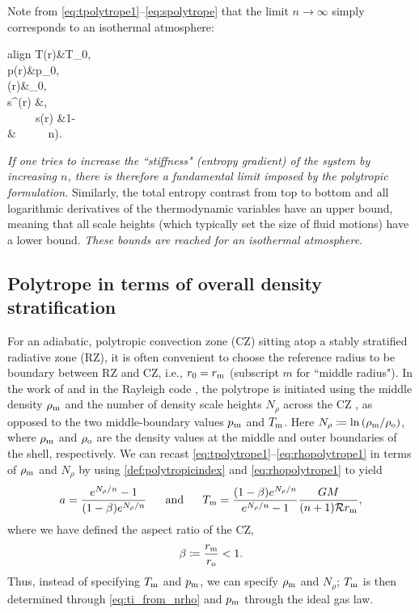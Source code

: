 \documentclass[12pt]{article} %
\newcommand{\rrm}{r_{\rm{m}}}
\newcommand{\andd}{\text{and}\ \ \ \ \ }
\newcommand{\five}{\ \ \ \ \ }
\begin{document}
Note from \eqref{eq:tpolytrope1}--\eqref{eq:spolytrope} that the limit $n\rightarrow\infty$ simply corresponds to an isothermal atmosphere:
	\begin{empheq}[box=\fbox]{align}\label{eq:limitninfty}
T(r)&\rightarrow T_0, \\
p(r)&\rightarrow p_0,\\
\rho(r)&\rightarrow \rho_0,\\
s^\prime(r) &\rightarrow {},\\
 \andd s(r) &\rightarrow {}\bigg{(}1-\bigg{)}\\ 
 &\ \ \ \ \  n\rightarrow\infty). \nonumber
\end{empheq}
\textit{If one tries to increase the ``stiffness" (entropy gradient) of the system by increasing $n$, there is therefore a fundamental limit imposed by the polytropic formulation.}
Similarly, the total entropy contrast from top to bottom and all logarithmic derivatives of the thermodynamic variables have an upper bound, meaning that all scale heights (which typically set the size of fluid motions) have a lower bound. \textit{These bounds are reached for an isothermal atmosphere.}

\subsection{Polytrope in terms of overall density stratification}
For an adiabatic, polytropic convection zone (CZ) sitting atop a stably stratified radiative zone (RZ), it is often convenient to choose the reference radius to be boundary between RZ and CZ, i.e., $r_0=\rrm$ (subscript $m$ for ``middle radius"). In the work of \citet{Jones11} and in the Rayleigh code \citep{Featherstone18}, the polytrope is initiated using the middle density $\rho_{\rm{m}}$ and the number of density scale heights $N_\rho$ across the CZ , as opposed to the two middle-boundary values $p_{\rm{m}}$ and $T_{\rm{m}}$. Here $N_\rho\coloneqq\ln{(\rho_{\rm{m}}/\rho_{\rm{o}})}$, where $\rho_{\rm{m}}$ and $\rho_{\rm{o}}$ are the density values at the middle and outer boundaries of the shell, respectively. We can recast \eqref{eq:tpolytrope1}--\eqref{eq:rhopolytrope1} in terms of $\rho_{\rm{m}}$ and $N_\rho$ by using \eqref{def:polytropicindex} and \eqref{eq:rhopolytrope1} to yield
\begin{align}
a = \frac{e^{N_\rho/n} - 1 }{(1 - \beta)e^{N_\rho/n}} \five \andd T_{\rm{m}} = \frac{(1 - \beta)e^{N_\rho/n}} {e^{N_\rho/n} - 1 }\frac{GM}{(n+1)\mathcal{R} \rrm},
\label{eq:ti_from_nrho}
\end{align}
where we have defined the aspect ratio of the CZ,
\begin{align}
\beta\coloneqq \frac{\rrm}{r_{\rm{o}}} < 1.
\label{def:beta}
\end{align}
Thus, instead of specifying $T_{\rm{m}}$ and $p_{\rm{m}}$, we can specify $\rho_{\rm{m}}$ and $N_\rho$; $T_{\rm{m}}$ is then determined through \eqref{eq:ti_from_nrho} and $p_{\rm{m}}$ through the ideal gas law. 
\end{document}
